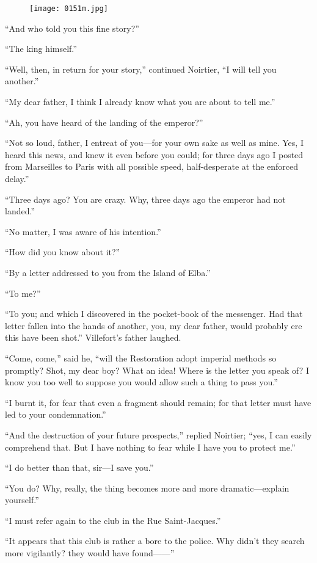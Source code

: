 \begin{figure}[h]
\texttt{[image: 0151m.jpg]}
\end{figure}

“And who told you this fine story?”

“The king himself.”

“Well, then, in return for your story,” continued Noirtier, “I will
tell you another.”

“My dear father, I think I already know what you are about to tell me.”

“Ah, you have heard of the landing of the emperor?”

“Not so loud, father, I entreat of you—for your own sake as well as
mine. Yes, I heard this news, and knew it even before you could; for
three days ago I posted from Marseilles to Paris with all possible
speed, half-desperate at the enforced delay.”

“Three days ago? You are crazy. Why, three days ago the emperor had not
landed.”

“No matter, I was aware of his intention.”

“How did you know about it?”

“By a letter addressed to you from the Island of Elba.”

“To me?”

“To you; and which I discovered in the pocket-book of the messenger.
Had that letter fallen into the hands of another, you, my dear father,
would probably ere this have been shot.” Villefort’s father laughed.

“Come, come,” said he, “will the Restoration adopt imperial methods so
promptly? Shot, my dear boy? What an idea! Where is the letter you
speak of? I know you too well to suppose you would allow such a thing
to pass you.”

“I burnt it, for fear that even a fragment should remain; for that
letter must have led to your condemnation.”

“And the destruction of your future prospects,” replied Noirtier; “yes,
I can easily comprehend that. But I have nothing to fear while I have
you to protect me.”

“I do better than that, sir—I save you.”

“You do? Why, really, the thing becomes more and more dramatic—explain
yourself.”

“I must refer again to the club in the Rue Saint-Jacques.”

“It appears that this club is rather a bore to the police. Why didn’t
they search more vigilantly? they would have found——”

